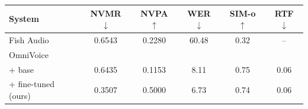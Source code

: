 \small
\begin{tabular}{lccccc}
\toprule
System & \textbf{NVMR} $\downarrow$ & \textbf{NVPA} $\uparrow$ & \textbf{WER} $\downarrow$ & \textbf{SIM-o} $\uparrow$ & \textbf{RTF} $\downarrow$ \\
\midrule
Fish Audio                   & 0.6543 & 0.2280 & 60.48 & 0.32 & -- \\
OmniVoice                   &        &        &      &      &    \\
\quad + base                 & 0.6435 & 0.1153 & 8.11 & 0.75 & 0.06 \\
\quad + fine-tuned (ours)    & 0.3507 & 0.5000 & 6.73 & 0.74 & 0.06 \\
\bottomrule
\end{tabular}
